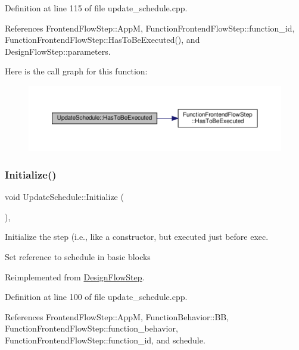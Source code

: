 Definition at line 115 of file update\+\_\+schedule.\+cpp.



References Frontend\+Flow\+Step\+::\+AppM, Function\+Frontend\+Flow\+Step\+::function\+\_\+id, Function\+Frontend\+Flow\+Step\+::\+Has\+To\+Be\+Executed(), and Design\+Flow\+Step\+::parameters.

Here is the call graph for this function\+:
\nopagebreak
\begin{figure}[H]
\begin{center}
\leavevmode
\includegraphics[width=350pt]{d2/de3/classUpdateSchedule_a8b63b0bd4821e2759cffe3a86910e430_cgraph}
\end{center}
\end{figure}
\mbox{\label{classUpdateSchedule_a4f3faaefc08037c8c273fef044f5bb60}} 
\subsubsection{\texorpdfstring{Initialize()}{Initialize()}}
{\footnotesize\ttfamily void Update\+Schedule\+::\+Initialize (\begin{DoxyParamCaption}{ }\end{DoxyParamCaption})\hspace{0.3cm}{\ttfamily [override]}, {\ttfamily [virtual]}}



Initialize the step (i.\+e., like a constructor, but executed just before exec. 

Set reference to schedule in basic blocks 

Reimplemented from \hyperlink{classDesignFlowStep_a44b50683382a094976e1d432a7784799}{Design\+Flow\+Step}.



Definition at line 100 of file update\+\_\+schedule.\+cpp.



References Frontend\+Flow\+Step\+::\+AppM, Function\+Behavior\+::\+BB, Function\+Frontend\+Flow\+Step\+::function\+\_\+behavior, Function\+Frontend\+Flow\+Step\+::function\+\_\+id, and schedule.

